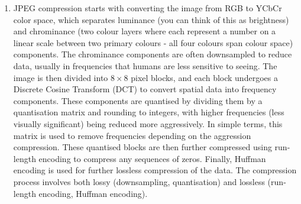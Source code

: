 \documentclass{article}
\begin{document}
\begin{solution}
\begin{enumerate}[label = (\alph*)]
\begin{enumerate}[label = (\roman*)]
        \item JPEG compression starts with converting the image from RGB to YCbCr color space, which separates luminance (you can think of this as brightness) and chrominance (two colour layers where each represent a number on a linear scale between two primary colours - all four colours span colour space) components. The chrominance components are often downsampled to reduce data, usually in frequencies that humans are less sensitive to seeing. The image is then divided into $8\times8$ pixel blocks, and each block undergoes a Discrete Cosine Transform (DCT) to convert spatial data into frequency components. These components are quantised by dividing them by a quantisation matrix and rounding to integers, with higher frequencies (less visually significant) being reduced more aggressively. In simple terms, this matrix is used to remove frequencies depending on the aggression compression. These quantised blocks are then further compressed using run-length encoding to compress any sequences of zeros. Finally, Huffman encoding is used for further lossless compression of the data. The compression process involves both lossy (downsampling, quantisation) and lossless (run-length encoding, Huffman encoding).
    \end{enumerate}
\end{enumerate}
\end{solution}
\end{document}
